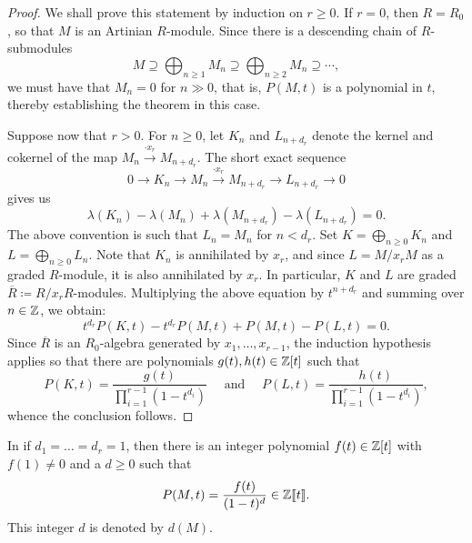 \begin{proof}
    We shall prove this statement by induction on $r\ge 0$. If $r = 0$, then $R = R_0$, so that $M$ is an Artinian $R$-module. Since there is a descending chain of $R$-submodules 
    \begin{equation*}
        M\supseteq\bigoplus_{n\ge 1} M_n\supseteq \bigoplus_{n\ge 2} M_n\supseteq\cdots,
    \end{equation*}
    we must have that $M_n = 0$ for $n\gg 0$, that is, $P(M, t)$ is a polynomial in $t$, thereby establishing the theorem in this case. 

    Suppose now that $r > 0$. For $n\ge 0$, let $K_n$ and $L_{n + d_r}$ denote the kernel and cokernel of the map $M_n\xrightarrow{\cdot x_r} M_{n + d_r}$. The short exact sequence 
    \begin{equation*}
        0\to K_n\to M_n\xrightarrow{\cdot x_r} M_{n + d_r}\to L_{n + d_r}\to 0
    \end{equation*}
    gives us 
    \begin{equation}
        \lambda(K_n) - \lambda(M_n) + \lambda(M_{n + d_r}) - \lambda(L_{n + d_r}) = 0.
    \end{equation}
    The above convention is such that $L_n = M_n$ for $n < d_r$. Set $K = \displaystyle\bigoplus_{n\ge 0} K_n$ and $L = \displaystyle\bigoplus_{n\ge 0} L_n$. Note that $K_n$ is annihilated by $x_r$, and since $L = M/x_r M$ as a graded $R$-module, it is also annihilated by $x_r$. In particular, $K$ and $L$ are graded $\overline R\coloneq R/x_r R$-modules. Multiplying the above equation by $t^{n + d_r}$ and summing over $n\in\mathbb{Z}$, we obtain:
    \begin{equation*}
        t^{d_r}P(K, t) - t^{d_r} P(M, t) + P(M, t) - P(L, t) = 0.
    \end{equation*}
    Since $\overline R$ is an $R_0$-algebra generated by $x_1,\dots,x_{r - 1}$, the induction hypothesis applies so that there are polynomials $g(t), h(t)\in\mathbb{Z}[t]$ such that 
    \begin{equation*}
        P(K, t) = \frac{g(t)}{\prod_{i = 1}^{r - 1}(1 - t^{d_i})}\quad\text{ and }\quad P(L, t) = \frac{h(t)}{\prod_{i = 1}^{r - 1}(1 - t^{d_i})},
    \end{equation*}
    whence the conclusion follows.
\end{proof}

\begin{definition}
    In  if $d_1 = \dots = d_r = 1$, then there is an integer polynomial $f(t)\in\mathbb{Z}[t]$ with $f(1)\ne 0$ and a $d\ge 0$ such that 
    \begin{equation*}
        P(M, t) = \frac{f(t)}{(1 - t)^d}\in\mathbb{Z}\llbracket t\rrbracket.
    \end{equation*}
    This integer $d$ is denoted by $d(M)$.
\end{definition}

